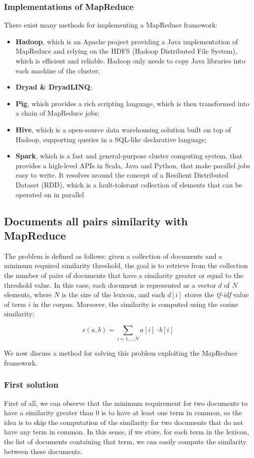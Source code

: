 \subsubsection{Implementations of MapReduce}
There exist many methods for implementing a MapReduce framework:

\begin{itemize}
    \item \textbf{Hadoop}, which is an Apache project providing a Java implementation of MapReduce and relying on the HDFS (Hadoop Distributed File System), which is efficient and reliable. Hadoop only needs to copy Java libraries into each machine of the cluster;
    \item \textbf{Dryad & DryadLINQ};
    \item \textbf{Pig}, which provides a rich scripting language, which is then transformed into a chain of MapReduce jobs;
    \item \textbf{Hive}, which is a open-source data warehousing solution built on top of Hadoop, supporting queries in a SQL-like declarative language;
    \item \textbf{Spark}, which is a fast and general-purpose cluster computing system, that provides a high-level APIs in Scala, Java and Python, that make parallel jobs easy to write. It resolves around the concept of a Resilient Distributed Dataset (RDD), which is a fault-tolerant collection of elements that can be operated on in parallel
\end{itemize}

\subsection{Documents all pairs similarity with MapReduce}
The problem is defined as follows: given a collection of documents and a minimum required similarity threshold, the goal is to retrieve from the collection the number of pairs of documents that have a similarity greater or equal to the threshold value. In this case, each document is represented as a vector $d$ of $N$ elements, where $N$ is the size of the lexicon, and each $d[i]$ stores the \textit{tf-idf} value of term $i$ in the corpus. Moreover, the similarity is computed using the cosine similarity:

$$
s(a,b) = \sum_{i = 1, .., N} a[i] \cdot b[i]
$$

We now discuss a method for solving this problem exploiting the MapReduce framework. 

\subsubsection{First solution}
First of all, we can observe that the minimum requirement for two documents to have a similarity greater than 0 is to have at least one term in common, so the idea is to skip the computation of the similarity for two documents that do not have any term in common. In this sense, if we store, for each term in the lexicon, the list of documents containing that term, we can easily compute the similarity between these documents.

